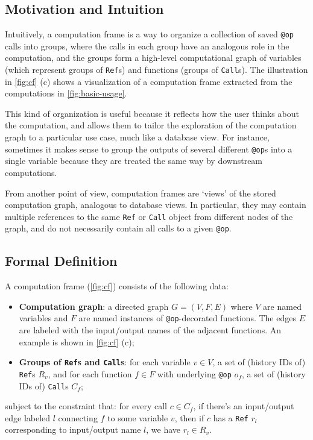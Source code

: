\subsection{Motivation and Intuition}
\label{subsection:cf-motivation-intuition}

Intuitively, a computation frame is a way to organize a collection of saved
\texttt{@op} calls into groups, where the calls in each group have an analogous
role in the computation, and the groups form a high-level computational graph of
variables (which represent groups of \texttt{Ref}s) and functions (groups of
\texttt{Call}s). The illustration in \autoref{fig:cf} (c) shows a
visualization of a computation frame extracted from the computations in \autoref{fig:basic-usage}.

This kind of organization is useful because it reflects how the user thinks
about the computation, and allows them to tailor the exploration of the
computation graph to a particular use case, much like a database view. For
instance, sometimes it makes sense to group the outputs of several different
\texttt{@op}s into a single variable because they are treated the same way by
downstream computations.

From another point of view, computation frames are `views' of the stored
computation graph, analogous to database views. In particular, they may contain
multiple references to the same \texttt{Ref} or \texttt{Call} object from
different nodes of the graph, and do not necessarily contain all calls to a
given \texttt{@op}.

\subsection{Formal Definition}
\label{subsection:cf-definition}


A computation frame (\autoref{fig:cf}) consists of the following data:
\begin{itemize}
\item \textbf{Computation graph}: a directed graph $G=(V,F,E)$ where $V$ are
named variables and $F$ are named instances of \texttt{@op}-decorated functions.
The edges $E$ are labeled with the input/output names of the adjacent functions.
An example is shown in \autoref{fig:cf} (c);
\item \textbf{Groups of \texttt{Ref}s and \texttt{Call}s}: for each variable
$v\in V$, a set of (history IDs of) \texttt{Ref}s $R_v$, and for each function
$f\in F$ with underlying \texttt{@op} $o_f$, a set of (history IDs of) \texttt{Call}s $C_f$;
\end{itemize}
subject to the constraint that: for every call $c\in C_f$, if there's an
input/output edge labeled $l$ connecting $f$ to some variable $v$, then if $c$
has a \texttt{Ref} $r_l$ corresponding to input/output name $l$, we have $r_l\in
R_v$.

